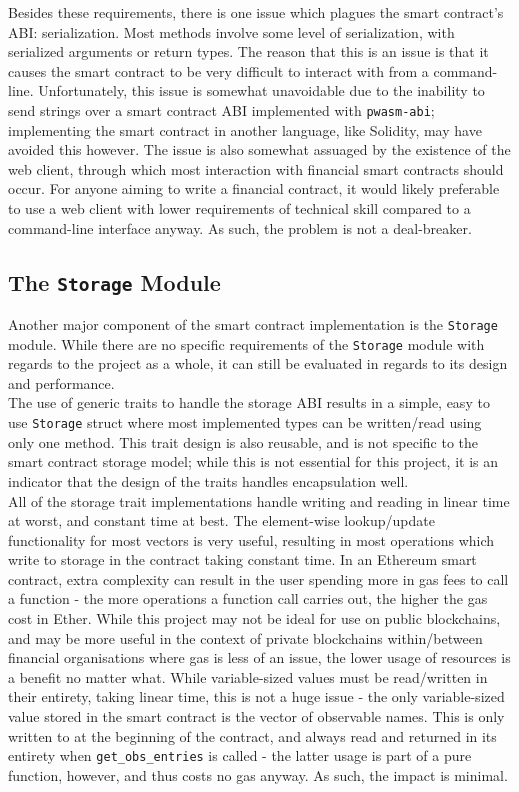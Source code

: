 Besides these requirements, there is one issue which plagues the smart contract's ABI: serialization. Most methods involve some level of serialization, with serialized arguments or return types. The reason that this is an issue is that it causes the smart contract to be very difficult to interact with from a command-line. Unfortunately, this issue is somewhat unavoidable due to the inability to send strings over a smart contract ABI implemented with \texttt{pwasm-abi}; implementing the smart contract in another language, like Solidity, may have avoided this however. The issue is also somewhat assuaged by the existence of the web client, through which most interaction with financial smart contracts should occur. For anyone aiming to write a financial contract, it would likely preferable to use a web client with lower requirements of technical skill compared to a command-line interface anyway. As such, the problem is not a deal-breaker.


\subsection{The \texttt{Storage} Module}

Another major component of the smart contract implementation is the \texttt{Storage} module. While there are no specific requirements of the \texttt{Storage} module with regards to the project as a whole, it can still be evaluated in regards to its design and performance. \\

The use of generic traits to handle the storage ABI results in a simple, easy to use \texttt{Storage} struct where most implemented types can be written/read using only one method. This trait design is also reusable, and is not specific to the smart contract storage model; while this is not essential for this project, it is an indicator that the design of the traits handles encapsulation well. \\

All of the storage trait implementations handle writing and reading in linear time at worst, and constant time at best. The element-wise lookup/update functionality for most vectors is very useful, resulting in most operations which write to storage in the contract taking constant time. In an Ethereum smart contract, extra complexity can result in the user spending more in gas fees to call a function - the more operations a function call carries out, the higher the gas cost in Ether. While this project may not be ideal for use on public blockchains, and may be more useful in the context of private blockchains within/between financial organisations where gas is less of an issue, the lower usage of resources is a benefit no matter what. While variable-sized values must be read/written in their entirety, taking linear time, this is not a huge issue - the only variable-sized value stored in the smart contract is the vector of observable names. This is only written to at the beginning of the contract, and always read and returned in its entirety when \texttt{get\_obs\_entries} is called - the latter usage is part of a pure function, however, and thus costs no gas anyway. As such, the impact is minimal. \\

